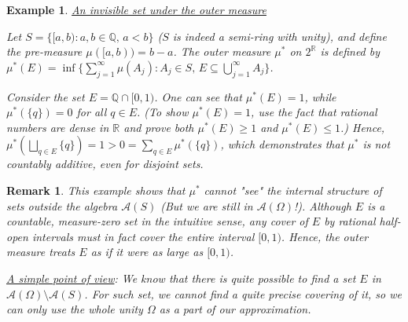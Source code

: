 \documentclass[12pt]{article}
\theoremstyle{blueplain}
\theoremstyle{bluedef}
\theoremstyle{blueremark}
\newtheorem{remark}{Remark}[section]
\newtheorem{example}{Example}[section]
\newcommand{\R}{\mathbb{R}}
\numberwithin{equation}{section}
\begin{document}
\begin{example}\underline{An invisible set under the outer measure}

  Let $S = \{ [a,b) : a,b \in \mathbb{Q},\, a < b \}$ ($S$ is indeed a semi-ring with unity), and define the pre-measure $\mu([a,b)) = b - a$. The outer measure $\mu^*$ on $2^{\mathbb{R}}$ is defined by $\mu^*(E) = \inf \{ \sum_{j=1}^{\infty} \mu(A_j) : A_j \in S,\, E \subseteq \bigcup_{j=1}^{\infty} A_j \}$.

  Consider the set $E = \mathbb{Q} \cap [0,1)$. One can see that $\mu^*(E) = 1$, while $\mu^*(\{q\}) = 0$ for all $q \in E$. (To show $\mu^*(E) = 1$, use the fact that rational numbers are dense in $\R$ and prove both $\mu^*(E) \geq 1$ and $\mu^*(E) \leq 1$.) Hence, $\mu^*(\bigsqcup_{q\in E}\{q\}) = 1 > 0 = \sum_{q\in E}\mu^*(\{q\})$, which demonstrates that $\mu^*$ is not countably additive, even for disjoint sets.
\end{example}

\begin{remark}
  This example shows that $\mu^*$ cannot "see" the internal structure of sets outside the algebra $\mathcal{A}(S)$ (But we are still in $\mathcal{A}(\Omega)$!). Although $E$ is a countable, measure-zero set in the intuitive sense, any cover of $E$ by rational half-open intervals must in fact cover the entire interval $[0,1)$. Hence, the outer measure treats $E$ as if it were as large as $[0,1)$.

  \underline{A simple point of view}: We know that there is quite possible to find a set $E$ in $\mathcal{A}(\Omega) \setminus \mathcal{A}(S)$. For such set, we cannot find a quite precise covering of it, so we can only use the whole unity $\Omega$ as a part of our approximation.
\end{remark}
\end{document}
